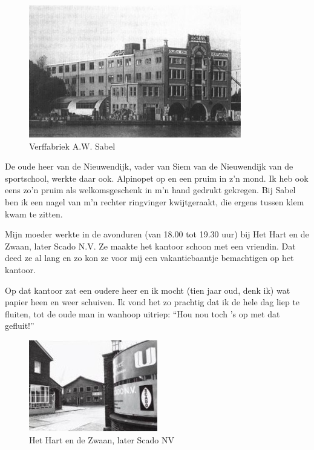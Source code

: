 \documentclass[10pt,twoside, openright]{memoir}
\begin{document}
\begin{figure}
\includegraphics[width=\textwidth]{img/ch32/sabel}
\caption*{\footnotesize Verffabriek A.W. Sabel}
\end{figure}


De oude heer van de Nieuwendijk, vader van Siem van de Nieuwendijk van de sportschool, werkte daar ook. Alpinopet op en een pruim in z’n mond. Ik heb ook eens zo’n pruim als welkomsgeschenk in m’n hand gedrukt gekregen. Bij Sabel ben ik een nagel van m’n rechter ringvinger kwijtgeraakt, die ergens tussen klem kwam te zitten.

Mijn moeder werkte in de avonduren (van 18.00 tot 19.30 uur) bij Het Hart en de Zwaan, later Scado N.V. Ze maakte het kantoor schoon met een vriendin. Dat deed ze al lang en zo kon ze voor mij een vakantiebaantje bemachtigen op het kantoor. 

Op dat kantoor zat een oudere heer en ik mocht (tien jaar oud, denk ik) wat papier heen en weer schuiven. Ik vond het zo prachtig dat ik de hele dag liep te fluiten, tot de oude man in wanhoop uitriep: ``Hou nou toch ’s op met dat gefluit!''

\begin{figure}
\includegraphics[width=\textwidth]{img/ch32/scado}
\caption*{\footnotesize Het Hart en de Zwaan, later Scado NV}
\end{figure}
\end{document}

